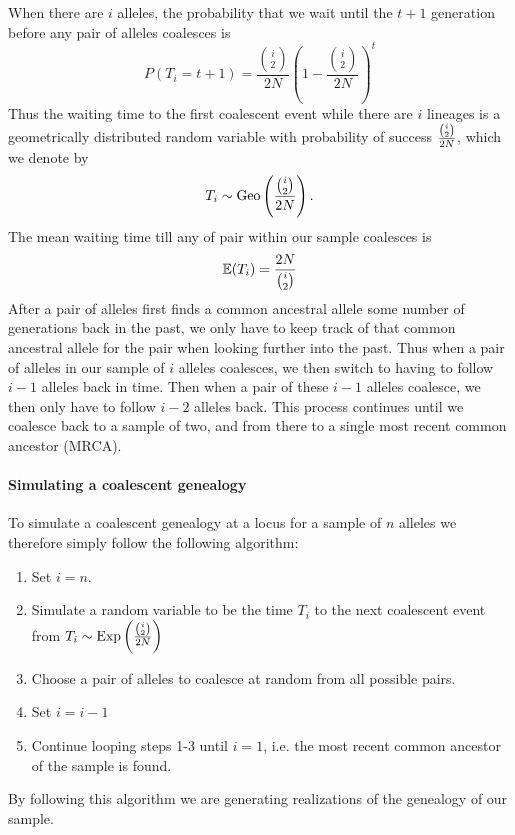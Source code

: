 When there are $i$ alleles, the probability that we wait until the
$t+1$ generation before
any pair of alleles coalesces is
\begin{equation}
P(T_i =t+1) = \frac{{i \choose
 2}}{2N}\left( 1- \frac{{i \choose
 2}}{2N}\right)^{t} \label{eqn:T_i}
\end{equation}
Thus the waiting time to the first coalescent event while there are $i$ lineages is a geometrically distributed random variable with probability of success $\nicefrac{{i \choose 2}}{2N}$, which we denote by
\begin{equation}
T_i \sim \text{Geo}
\left(  \nicefrac{{i \choose
      2}}{2N} \right).
\end{equation}
The mean waiting time till any of pair within our
 sample coalesces is 
\begin{equation}
\E( T_i) = \frac{2N}{{i \choose  2}}  \label{eqn:E_T_i}
\end{equation}
After a pair of alleles first finds a common ancestral allele some
number of generations back in the past, we only have to keep
track of that common ancestral allele for the pair when looking further into the past. Thus when a pair
of alleles in our sample of $i$ alleles coalesces, we then switch to
having to follow $i-1$ alleles back in time. Then when a pair of these $i-1$
alleles coalesce, we then only have to follow $i-2$ alleles back. This
process continues until we coalesce back to a sample of two, and from
there to a single most recent common ancestor (MRCA).\\


\paragraph{Simulating a coalescent genealogy}
To simulate a coalescent genealogy at a locus for a sample of $n$ alleles we therefore simply follow the following
algorithm:
\begin{enumerate}
\item Set $i=n$.
\item Simulate a random variable to be the time $T_i$ to the next coalescent event from $T_i \sim
  \text{Exp}\left(\nicefrac{{i \choose
 2}}{2N} \right)$
\item Choose a pair of alleles to coalesce at random from all possible
 pairs.
\item Set $i=i-1$
\item Continue looping steps 1-3 until $i=1$, i.e. the most recent
 common ancestor of the sample is found.
\end{enumerate}
By following this algorithm we are generating realizations of the
genealogy of our sample. \\



